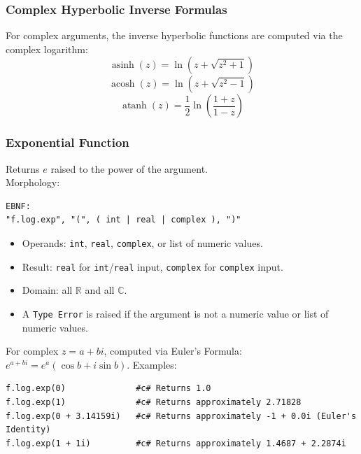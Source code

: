 \subsubsection{Complex Hyperbolic Inverse Formulas}
For complex arguments, the inverse hyperbolic functions are computed via the complex logarithm:
\[
\operatorname{asinh}(z) = \ln\!\left(z + \sqrt{z^2 + 1}\right)
\]
\[
\operatorname{acosh}(z) = \ln\!\left(z + \sqrt{z^2 - 1}\right)
\]
\[
\operatorname{atanh}(z) = \frac{1}{2} \ln\!\left(\frac{1 + z}{1 - z}\right)
\]

\subsubsection{Exponential Function}
Returns $e$ raised to the power of the argument. \\
Morphology:
\begin{verbatim}
EBNF:
"f.log.exp", "(", ( int | real | complex ), ")"
\end{verbatim}
\begin{itemize}
\item Operands: \texttt{int}, \texttt{real}, \texttt{complex}, or list of numeric values.
\item Result: \texttt{real} for \texttt{int}/\texttt{real} input, \texttt{complex} for \texttt{complex} input.
\item Domain: all $\mathbb{R}$ and all $\mathbb{C}$.
\item A \texttt{Type Error} is raised if the argument is not a numeric value or list of numeric values.
\end{itemize}
For complex $z = a + bi$, computed via Euler's Formula: $e^{a+bi} = e^a(\cos b + i \sin b)$.
Examples:
\begin{verbatim}
f.log.exp(0)              #c# Returns 1.0
f.log.exp(1)              #c# Returns approximately 2.71828
f.log.exp(0 + 3.14159i)   #c# Returns approximately -1 + 0.0i (Euler's Identity)
f.log.exp(1 + 1i)         #c# Returns approximately 1.4687 + 2.2874i
\end{verbatim}


